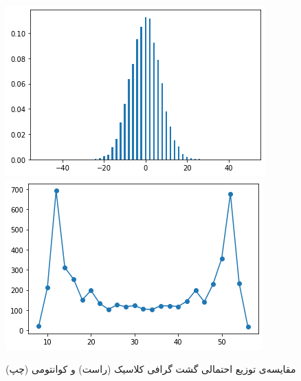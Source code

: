 \begin{figure}
	\centering
	\includegraphics[scale=0.5]{figures/classical_distribution.png}
	\includegraphics[scale=0.5]{figures/quantum_distribution.png}
	\caption [
	مقایسه‌ی توزیع احتمالی گشت گرافی کلاسیک و کوانتوم
	]{
	مقایسه‌ی توزیع احتمالی گشت گرافی کلاسیک (راست) و کوانتومی (چپ)
	\cite{cirq_qwalk}
	}
	\label{fig:walk_distr}
\end{figure}

